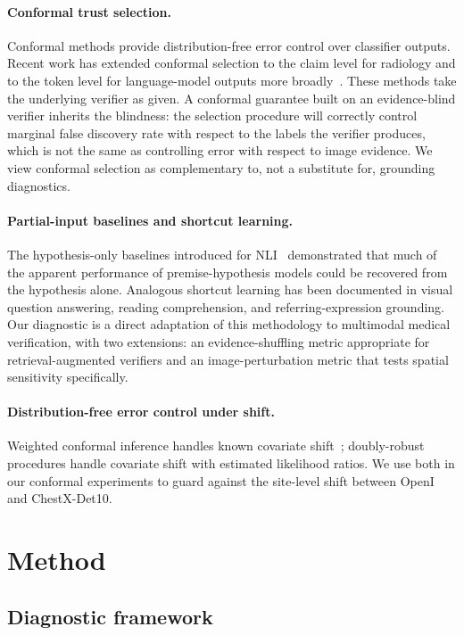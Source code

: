 \documentclass[11pt]{article}
\begin{document}
\paragraph{Conformal trust selection.} Conformal methods provide distribution-free error control over classifier outputs. Recent work has extended conformal selection to the claim level for radiology and to the token level for language-model outputs more broadly~\cite{mohri2024language,angelopoulos2021gentle}. These methods take the underlying verifier as given. A conformal guarantee built on an evidence-blind verifier inherits the blindness: the selection procedure will correctly control marginal false discovery rate with respect to the labels the verifier produces, which is not the same as controlling error with respect to image evidence. We view conformal selection as complementary to, not a substitute for, grounding diagnostics.

\paragraph{Partial-input baselines and shortcut learning.} The hypothesis-only baselines introduced for NLI~\cite{gururangan2018annotation,poliak2018hypothesis} demonstrated that much of the apparent performance of premise-hypothesis models could be recovered from the hypothesis alone. Analogous shortcut learning has been documented in visual question answering, reading comprehension, and referring-expression grounding. Our diagnostic is a direct adaptation of this methodology to multimodal medical verification, with two extensions: an evidence-shuffling metric appropriate for retrieval-augmented verifiers and an image-perturbation metric that tests spatial sensitivity specifically.

\paragraph{Distribution-free error control under shift.} Weighted conformal inference handles known covariate shift~\cite{tibshirani2019conformal}; doubly-robust procedures handle covariate shift with estimated likelihood ratios. We use both in our conformal experiments to guard against the site-level shift between OpenI and ChestX-Det10.

\section{Method}

\subsection{Diagnostic framework}
\end{document}
